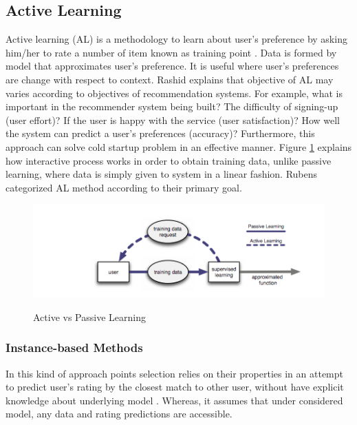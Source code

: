 \subsection{Active Learning}

Active learning (AL) is a methodology to learn about user’s preference by asking him/her to rate a number of item known as training point \cite{ rubens2011active}. Data is formed by model that approximates user’s preference. It is useful where user’s preferences are change with respect to context. Rashid \cite{rashid2008learning} explains that objective of AL may varies according to objectives of recommendation systems. For example, what is important in the recommender system being built? The difficulty of signing-up (user effort)? If the user is happy with the service (user satisfaction)? How well the system can predict a user’s preferences (accuracy)? Furthermore, this approach can solve cold startup problem in an effective manner. Figure \ref{fig:ch2_active_learning} explains how interactive process works in order to obtain training data, unlike passive learning, where data is simply given to system in a linear fashion. Rubens \cite{ rubens2011active} categorized AL method according to their primary goal.  

\begin{figure}[h]
	\centering
	\includegraphics[width=1\linewidth]{figures/ch2_active_learning.png}
	\caption{Active vs Passive Learning}
	\cite{ rubens2011active}
	\label{fig:ch2_active_learning}
\end{figure}

\subsubsection{Instance-based Methods}

In this kind of approach points selection relies on their properties in an attempt to predict user’s rating by the closest match to other user, without have explicit knowledge about underlying model \cite{adomavicius2005toward}. Whereas, it assumes that under considered model, any data and rating predictions are accessible.

